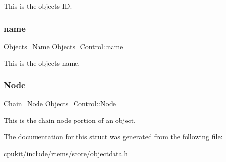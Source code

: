 This is the object\textquotesingle{}s ID. \mbox{\label{structObjects__Control_aed21a59f2335bbb5f3348332c99f0f6e}} 
\subsubsection{\texorpdfstring{name}{name}}
{\footnotesize\ttfamily \mbox{\hyperlink{unionObjects__Name}{Objects\+\_\+\+Name}} Objects\+\_\+\+Control\+::name}

This is the object\textquotesingle{}s name. \mbox{\label{structObjects__Control_a0ba3a7dbe38f7c42522d4c4542095d4a}} 
\subsubsection{\texorpdfstring{Node}{Node}}
{\footnotesize\ttfamily \mbox{\hyperlink{group__RTEMSScoreChain_ga0dd4bfcca1ac7f90de2842e447846d3d}{Chain\+\_\+\+Node}} Objects\+\_\+\+Control\+::\+Node}

This is the chain node portion of an object. 

The documentation for this struct was generated from the following file\+:\begin{DoxyCompactItemize}
\item 
cpukit/include/rtems/score/\mbox{\hyperlink{objectdata_8h}{objectdata.\+h}}\end{DoxyCompactItemize}
